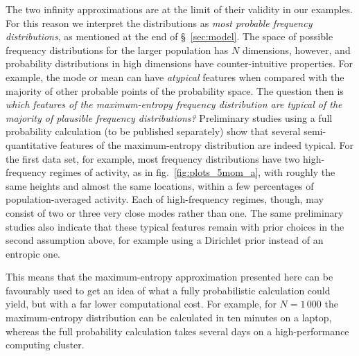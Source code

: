 \documentclass[\ifafour a4paper,12pt,\else a5paper,10pt,\fi%
onecolumn,oneside,article,%
british%
]{memoir}
\theoremstyle{remark}
\theoremstyle{innote}
\renewcommand*{\|}{\nonscript\,\vert\nonscript\;\mathopen{}}
\newcommand*{\sect}{\S}%
\newcommand*{\fig}{fig.}%
\begin{document}
The two infinity approximations are at the limit of their validity in our
examples. For this reason we interpret the distributions as \emph{most
  probable frequency distributions}, as mentioned at the end of
\sect~\ref{sec:model}. The space of possible frequency distributions for
the larger population has $N$ dimensions, however, and probability
distributions in high dimensions have counter-intuitive properties. For
example, the mode or mean can have \emph{atypical} features when compared
with the majority of other probable points of the probability space. The
question then is \emph{which features of the maximum-entropy frequency
  distribution are typical of the majority of plausible frequency
  distributions?} Preliminary studies using a full probability calculation
(to be published separately) show that several semi-quantitative features
of the maximum-entropy distribution are indeed typical. For the first data
set, for example, most frequency distributions have two high-frequency
regimes of activity, as in \fig~\ref{fig:plots_5mom_a}, with roughly the
same heights and almost the same locations, within a few percentages of
population-averaged activity. Each of high-frequency regimes, though, may
consist of two or three very close modes rather than one. The same
preliminary studies also indicate that these typical features remain with
prior choices in the second assumption above, for example using a Dirichlet
prior instead of an entropic one.

This means that the maximum-entropy approximation presented here can be
favourably used to get an idea of what a fully probabilistic calculation
could yield, but with a far lower computational cost. For example, for
$N=1\,000$ the maximum-entropy distribution can be calculated in ten
minutes on a laptop, whereas the full probability calculation takes several
days on a high-performance computing cluster.



\end{document}
